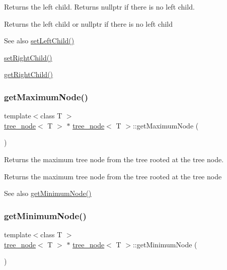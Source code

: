 Returns the left child. Returns nullptr if there is no left child. \begin{DoxyReturn}{Returns}
the left child or nullptr if there is no left child 
\end{DoxyReturn}
\begin{DoxySeeAlso}{See also}
\hyperlink{classtree__node_a3db979969a0fe8505ba65c7afabb5463}{set\+Left\+Child()} 

\hyperlink{classtree__node_afea4c6595dafba65b5c4e59ca3da30f3}{set\+Right\+Child()} 

\hyperlink{classtree__node_a5e584d47f2c11941fe0406836fe50159}{get\+Right\+Child()} 
\end{DoxySeeAlso}
\mbox{\label{classtree__node_a70bdade8011a6a46b083ea680fcea52f}} 
\subsubsection{\texorpdfstring{get\+Maximum\+Node()}{getMaximumNode()}}
{\footnotesize\ttfamily template$<$class T $>$ \\
\hyperlink{classtree__node}{tree\+\_\+node}$<$ T $>$ $\ast$ \hyperlink{classtree__node}{tree\+\_\+node}$<$ T $>$\+::get\+Maximum\+Node (\begin{DoxyParamCaption}{ }\end{DoxyParamCaption})}

Returns the maximum tree node from the tree rooted at the tree node. \begin{DoxyReturn}{Returns}
the maximum tree node from the tree rooted at the tree node 
\end{DoxyReturn}
\begin{DoxySeeAlso}{See also}
\hyperlink{classtree__node_afde196c44a09ac3fe97347d31540ea93}{get\+Minimum\+Node()} 
\end{DoxySeeAlso}
\mbox{\label{classtree__node_afde196c44a09ac3fe97347d31540ea93}} 
\subsubsection{\texorpdfstring{get\+Minimum\+Node()}{getMinimumNode()}}
{\footnotesize\ttfamily template$<$class T $>$ \\
\hyperlink{classtree__node}{tree\+\_\+node}$<$ T $>$ $\ast$ \hyperlink{classtree__node}{tree\+\_\+node}$<$ T $>$\+::get\+Minimum\+Node (\begin{DoxyParamCaption}{ }\end{DoxyParamCaption})}

